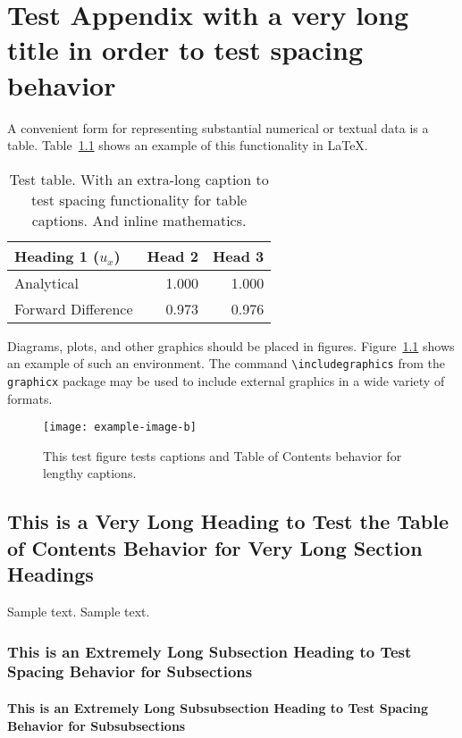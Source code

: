 \chapter{Test Appendix with a very long title in order to test spacing behavior} \label{app:test}
\lipsum[2]

A convenient form for representing substantial numerical or textual data is a table. 
Table~\ref{tab:test} shows an example of this functionality in \LaTeX.
\begin{table}
  \centering
  \caption{Test table. With an extra-long caption to test spacing functionality for table captions. And inline mathematics.}
  \begin{tabular}{lrr}
    \toprule
    Heading 1 ($u_x$)  & Head 2 & Head 3 \\
    \midrule
    Analytical         & 1.000  & 1.000  \\
    Forward Difference & 0.973  & 0.976  \\
    \bottomrule
  \end{tabular}
  \label{tab:test}
\end{table}
Diagrams, plots, and other graphics should be placed in figures. 
Figure~\ref{fig:test} shows an example of such an environment.
The command \verb+\includegraphics+ from the \verb+graphicx+ package may be used to include external graphics in a wide variety of formats.
\begin{figure}
  \centering 
  \texttt{[image: example-image-b]}
  \caption{This test figure tests captions and Table of Contents 
    behavior for lengthy captions.}
  \label{fig:test}
\end{figure}

\section{This is a Very Long Heading to Test the Table of Contents Behavior for Very Long Section Headings}
Sample text. Sample text.

\subsection{This is an Extremely Long Subsection Heading to Test Spacing Behavior for Subsections}
\lipsum[3]

\subsubsection{This is an Extremely Long Subsubsection Heading to Test Spacing Behavior for Subsubsections}
\lipsum[4-5]
